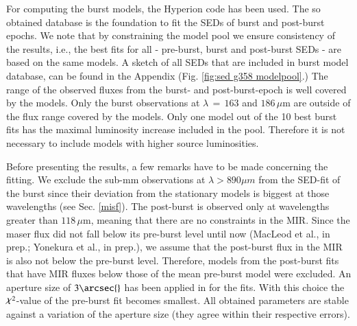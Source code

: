For computing the burst models, the Hyperion code 
\citep{Robitaille2011} has been used. 
The so obtained database is the foundation to fit the SEDs of burst and post-burst epochs. 
We note that by constraining the model pool we ensure consistency of the results, i.e., the best fits for all - pre-burst, burst and post-burst SEDs - are based on the same models. 
A sketch of all SEDs that are included in burst model database, can be found in the Appendix (Fig. \ref{fig:sed g358 modelpool}.) The range of the observed fluxes from the burst- and post-burst-epoch is well covered by the models. Only the burst observations at $\lambda\,{=}\,163$ and $186\,\mu$m are outside of the flux range covered by the models.
Only one model out of the 10 best burst fits has the maximal luminosity increase included in the pool. Therefore it is not necessary to include models with higher source luminosities.

Before presenting the results, a few remarks have to be made concerning the fitting. We exclude the sub-mm observations at $\lambda>890\mu m$ from the SED-fit of the burst since their deviation from the stationary models is biggest at those wavelengths (see Sec. \ref{misf}). The post-burst is observed only at wavelengths greater than $118\,\mu$m, meaning that there are no constraints in the MIR. Since the maser flux did not fall below its pre-burst level until now (MacLeod et al., in prep.; Yonekura et al., in prep.), we assume that the post-burst flux in the MIR is also not below the pre-burst level. Therefore, models from the post-burst fits that have MIR fluxes below those of the mean pre-burst model were excluded.
An aperture size of $3\arcsec{}$ has been applied in for the fits. With this choice the $\goodchi^2$-value of the pre-burst fit becomes smallest. All obtained parameters are stable against a variation of the aperture size (they agree within their respective errors).



